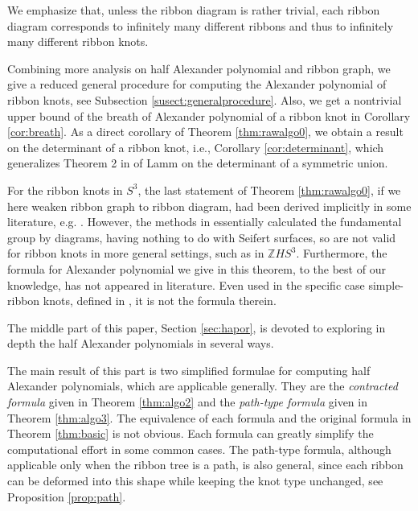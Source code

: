 \documentclass{amsart}
\theoremstyle{definition}
\theoremstyle{remark}
\numberwithin{equation}{subsection}
\begin{document}
We emphasize that, unless the ribbon diagram is rather trivial, each ribbon diagram corresponds to infinitely many different ribbons and thus to infinitely many different ribbon knots. 

Combining more analysis on half Alexander polynomial and ribbon graph, we give a reduced general procedure for computing the Alexander polynomial of ribbon knots, see Subsection \ref{susect:generalprocedure}. Also, we get a nontrivial upper bound of the breath of Alexander polynomial of a ribbon knot in Corollary \ref{cor:breath}. As a direct corollary of Theorem \ref{thm:rawalgo0}, we obtain a result on the determinant of a ribbon knot, i.e., Corollary \ref{cor:determinant}, which generalizes Theorem 2 in \cite{Lamm2000} of Lamm on the determinant of a symmetric union.

For the ribbon knots in $ S^3 $, the last statement of Theorem \ref{thm:rawalgo0}, if we here weaken ribbon graph to ribbon diagram, had been derived implicitly in some literature, e.g. \cite{Terasaka1959}. However, the methods in \cite{Terasaka1959} essentially calculated the fundamental group by diagrams, having nothing to do with Seifert surfaces, so are not valid for ribbon knots in more general settings, such as in $ \mathbb{Z}HS^3 $. 
Furthermore, the formula for Alexander polynomial we give in this theorem, to the best of our knowledge, has not appeared in literature. Even used in the specific case simple-ribbon knots, defined in \cite{KishimotoShibuyaTsukamotoIshikawa2021}, it is not the formula therein. 


The middle part of this paper, Section \ref{sec:hapor}, is devoted to exploring in depth the half Alexander polynomials in several ways. 

The main result of this part is two simplified formulae for computing half Alexander polynomials, which are applicable generally. They are the \emph{contracted formula} given in Theorem \ref{thm:algo2} and the \emph{path-type formula} given in Theorem \ref{thm:algo3}. The equivalence of each formula and the original formula in Theorem \ref{thm:basic} is not obvious. Each formula can greatly simplify the computational effort in some common cases. The path-type formula, although applicable only when the ribbon tree is a path, is also general, since each ribbon can be deformed into this shape while keeping the knot type unchanged, see Proposition \ref{prop:path}.
\end{document}
